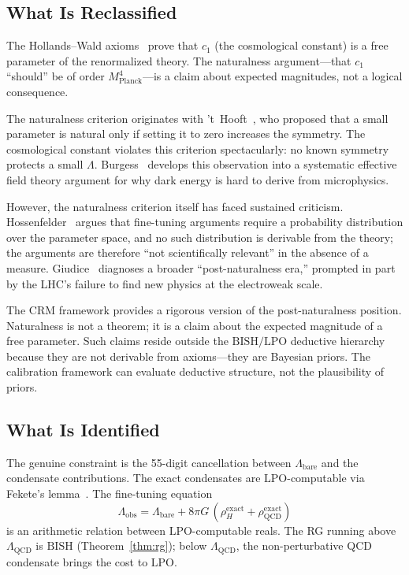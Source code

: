 \documentclass[11pt,a4paper]{article}
\theoremstyle{plain}
\theoremstyle{definition}
\newcommand{\LPO}{\ensuremath{\mathrm{LPO}}}
\newcommand{\BISH}{\ensuremath{\mathrm{BISH}}}
\newcommand{\Lobs}{\Lambda_{\mathrm{obs}}}
\newcommand{\Lbare}{\Lambda_{\mathrm{bare}}}
\newcommand{\MPl}{M_{\mathrm{Planck}}}
\newcommand{\LQCD}{\Lambda_{\mathrm{QCD}}}
\begin{document}
\subsection{What Is Reclassified}

The Hollands--Wald axioms~\cite{HollandsWald2001,HollandsWald2005}
prove that $c_1$ (the cosmological constant)
is a free parameter of the renormalized theory.  The naturalness
argument---that $c_1$ ``should'' be of order $\MPl^4$---is a claim
about expected magnitudes, not a logical consequence.

The naturalness criterion originates with
't~Hooft~\cite{tHooft1980}, who proposed that a small parameter
is natural only if setting it to zero increases the symmetry.
The cosmological constant violates this criterion spectacularly:
no known symmetry protects a small $\Lambda$.
Burgess~\cite{Burgess2013} develops this observation into a
systematic effective field theory argument for why dark energy
is hard to derive from microphysics.

However, the naturalness criterion itself has faced sustained
criticism.  Hossenfelder~\cite{Hossenfelder2019} argues that
fine-tuning arguments require a probability distribution over
the parameter space, and no such distribution is derivable from
the theory; the arguments are therefore ``not scientifically
relevant'' in the absence of a measure.
Giudice~\cite{Giudice2017} diagnoses a broader ``post-naturalness
era,'' prompted in part by the LHC's failure to find new physics
at the electroweak scale.

The CRM framework provides a rigorous version of the
post-naturalness position.  Naturalness is not a theorem; it is
a claim about the expected magnitude of a free parameter.  Such
claims reside outside the $\BISH/\LPO$ deductive hierarchy because
they are not derivable from axioms---they are Bayesian priors.
The calibration framework can evaluate deductive structure, not
the plausibility of priors.

\subsection{What Is Identified}

The genuine constraint is the 55-digit cancellation between $\Lbare$
and the condensate contributions.  The exact condensates are
$\LPO$-computable via Fekete's lemma~\cite{Fekete1923,Lee26P29}.
The fine-tuning equation
\[
  \Lobs = \Lbare + 8\pi G\,(\rho_H^{\mathrm{exact}}
    + \rho_{\mathrm{QCD}}^{\mathrm{exact}})
\]
is an arithmetic relation between $\LPO$-computable reals.
The RG running above $\LQCD$ is $\BISH$ (Theorem~\ref{thm:rg});
below $\LQCD$, the non-perturbative QCD condensate brings the cost
to $\LPO$.
\end{document}

